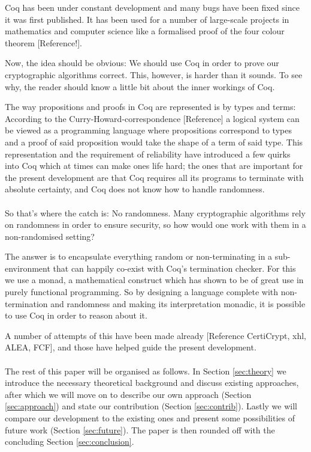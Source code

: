 \documentclass[titlepage]{article}
\begin{document}
Coq has been under constant development and many bugs have been fixed since it was
first published. It has been used for a number of large-scale projects in mathematics
and computer science like a formalised proof of the four colour theorem
[Reference!].

Now, the idea should be obvious: We should use Coq in order to prove our
cryptographic algorithms correct. This, however, is harder than it sounds. To see
why, the reader should know a little bit about the inner workings of Coq. 

The way propositions and proofs in Coq are represented is by types and terms:
According to the Curry-Howard-correspondence [Reference] a logical system can be
viewed as a programming language where propositions correspond to types and a proof
of said proposition would take the shape of a term of said type. This representation
and the requirement of reliability have introduced a few quirks into Coq which at
times can make ones life hard; the ones that are important for the present
development are that Coq requires all its programs to terminate with absolute
certainty, and Coq does not know how to handle randomness. \\
\\
So that's where the catch is: No randomness. Many cryptographic algorithms rely on
randomness in order to ensure security, so how would one work with them in a
non-randomised setting?

The answer is to encapsulate everything random or non-terminating in a
sub-environment that can happily co-exist with Coq's termination checker. For this we
use a monad, a mathematical construct which has shown to be of great use in
purely functional programming. So by designing a language complete with
non-termination and randomness and making its interpretation monadic, it is possible
to use Coq in order to reason about it.

A number of attempts of this have been made already [Reference CertiCrypt, xhl, ALEA,
FCF], and those have helped guide the present development.\\
\\
The rest of this paper will be organised as follows. In Section \ref{sec:theory} we
introduce the necessary theoretical background and discuss existing approaches, after
which we will move on to describe our own approach (Section \ref{sec:approach}) and
state our contribution (Section \ref{sec:contrib}). Lastly we will compare our
development to the existing ones and present some possibilities of future work
(Section \ref{sec:future}). The paper is then rounded off with the concluding Section
  \ref{sec:conclusion}. 
\end{document}

